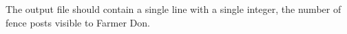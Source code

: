 The output file should contain a single line with a single integer, the number of fence posts visible to Farmer Don.